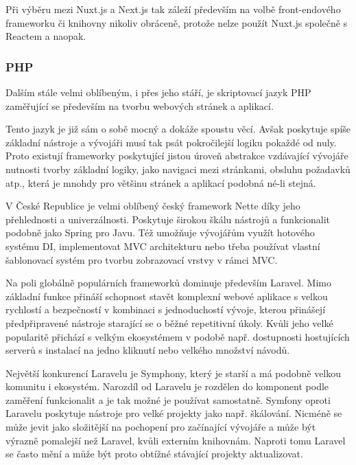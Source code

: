 		Při výběru mezi Nuxt.js a Next.js tak záleží především na volbě front-endového frameworku či knihovny
		nikoliv obráceně, protože nelze použít Nuxt.js společně s Reactem a naopak.

		\subsubsection{PHP}

		Dalším stále velmi oblíbeným, i přes jeho stáří, je skriptovací jazyk \noindent\Ac{PHP} zaměřující se především na tvorbu
		webových stránek a aplikací. \cite{php}

		Tento jazyk je již sám o sobě mocný a dokáže spoustu věcí.
		Avšak poskytuje spíše základní nástroje a vývojáři musí tak psát pokročilejší logiku pokaždé od nuly.
		Proto existují frameworky poskytující jistou úroveň abstrakce vzdávající vývojáře nutnosti tvorby základní logiky,
		jako navigaci mezi stránkami, obsluhu požadavků atp., která je mnohdy pro většinu stránek a aplikací podobná
		né-li stejná. \cite{best_php_frameworks}

		V České Republice je velmi oblíbený český framework Nette díky jeho přehlednosti a univerzálnosti.
		Poskytuje širokou škálu nástrojů a funkcionalit podobně jako Spring pro Javu.
		Též umožňuje vývojářům využít hotového systému \Ac{DI}, implementovat \Ac{MVC} architekturu nebo třeba používat
		vlastní šablonovací systém pro tvorbu zobrazovací vrstvy v rámci \Ac{MVC}. \cite{proc_pouzivat_nette}

		Na poli globálně populárních frameworků dominuje především Laravel.
		Mimo základní funkce přináší schopnost stavět komplexní webové aplikace s velkou rychlostí a bezpečností
		v kombinaci s jednoduchostí vývoje, kterou přinášejí předpřipravené nástroje starající se o běžné repetitivní
		úkoly.
		Kvůli jeho velké popularitě přichází s velkým ekosystémem v podobě např. dostupnosti hostujících serverů
		s instalací na jedno kliknutí nebo velkého množství návodů. \cite{best_php_frameworks}

		Největší konkurencí Laravelu je Symphony, který je starší a má podobně velkou komunitu i ekosystém.
		Narozdíl od Laravelu je rozdělen do komponent podle zaměření funkcionalit a je tak možné je používat samostatně. \cite{best_php_frameworks}
		Symfony oproti Laravelu poskytuje nástroje pro velké projekty jako např. škálování.
		Nicméně se může jevit jako složitější na pochopení pro začínající vývojáře a může být výrazně pomalejší
		než Laravel, kvůli externím knihovnám.
		Naproti tomu Laravel se často mění a může být proto obtížné stávající projekty aktualizovat.
		\cite{laravel_vs_symfony_in_2021}

